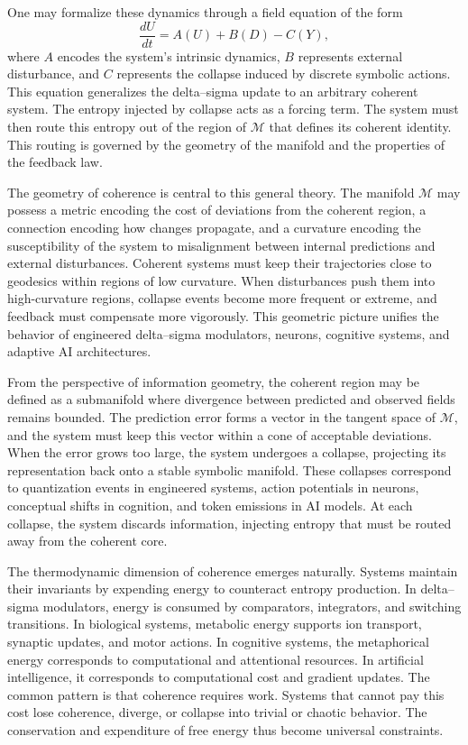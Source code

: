 One may formalize these dynamics through a field equation of the form
\[
\frac{dU}{dt} = A(U) + B(D) - C(Y),
\]
where \(A\) encodes the system’s intrinsic dynamics, \(B\) represents external disturbance, and \(C\) represents the collapse induced by discrete symbolic actions. This equation generalizes the delta–sigma update to an arbitrary coherent system. The entropy injected by collapse acts as a forcing term. The system must then route this entropy out of the region of \(\mathcal{M}\) that defines its coherent identity. This routing is governed by the geometry of the manifold and the properties of the feedback law.

The geometry of coherence is central to this general theory. The manifold \(\mathcal{M}\) may possess a metric encoding the cost of deviations from the coherent region, a connection encoding how changes propagate, and a curvature encoding the susceptibility of the system to misalignment between internal predictions and external disturbances. Coherent systems must keep their trajectories close to geodesics within regions of low curvature. When disturbances push them into high-curvature regions, collapse events become more frequent or extreme, and feedback must compensate more vigorously. This geometric picture unifies the behavior of engineered delta–sigma modulators, neurons, cognitive systems, and adaptive AI architectures.

From the perspective of information geometry, the coherent region may be defined as a submanifold where divergence between predicted and observed fields remains bounded. The prediction error forms a vector in the tangent space of \(\mathcal{M}\), and the system must keep this vector within a cone of acceptable deviations. When the error grows too large, the system undergoes a collapse, projecting its representation back onto a stable symbolic manifold. These collapses correspond to quantization events in engineered systems, action potentials in neurons, conceptual shifts in cognition, and token emissions in AI models. At each collapse, the system discards information, injecting entropy that must be routed away from the coherent core.

The thermodynamic dimension of coherence emerges naturally. Systems maintain their invariants by expending energy to counteract entropy production. In delta–sigma modulators, energy is consumed by comparators, integrators, and switching transitions. In biological systems, metabolic energy supports ion transport, synaptic updates, and motor actions. In cognitive systems, the metaphorical energy corresponds to computational and attentional resources. In artificial intelligence, it corresponds to computational cost and gradient updates. The common pattern is that coherence requires work. Systems that cannot pay this cost lose coherence, diverge, or collapse into trivial or chaotic behavior. The conservation and expenditure of free energy thus become universal constraints.

